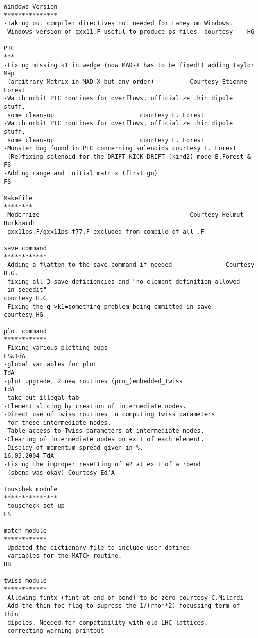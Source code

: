 \begin{verbatim}
Windows Version
***************
-Taking out compiler directives not needed for Lahey om Windows.
-Windows version of gxx11.F useful to produce ps files  courtesy    HG

PTC
***
-Fixing missing k1 in wedge (now MAD-X has to be fixed!) adding Taylor Map
 (arbitrary Matrix in MAD-X but any order)          Courtesy Etienne Forest
-Watch orbit PTC routines for overflows, officialize thin dipole stuff,
 some clean-up                        courtesy E. Forest
-Watch orbit PTC routines for overflows, officialize thin dipole stuff,
 some clean-up                        courtesy E. Forest
-Monster bug found in PTC concerning solenoids courtesy E. Forest
-(Re)fixing solenoid for the DRIFT-KICK-DRIFT (kind2) mode E.Forest & FS
-Adding range and initial matrix (first go)                           FS

Makefile
********
-Modernize                                          Courtesy Helmut Burkhardt
-gxx11ps.F/gxx11ps_f77.F excluded from compile of all .F

save command
************
-Adding a flatten to the save command if needed               Courtesy H.G.
-fixing all 3 save deficiencies and "no element definition allowed
 in seqedit"                                                   courtesy H.G
-Fixing the q->k1=something problem being ommitted in save     courtesy HG

plot command
************
-Fixing various plotting bugs                                         FS&TdA
-global variables for plot                                           TdA
-plot upgrade, 2 new routines (pro_)embedded_twiss                    TdA
-take out illegal tab
-Element slicing by creation of intermediate nodes.
-Direct use of twiss routines in computing Twiss parameters 
 for these intermediate nodes.
-Table access to Twiss parameters at intermediate nodes.
-Clearing of intermediate nodes on exit of each element.
-Display of momentum spread given in %.                       16.03.2004 TdA
-Fixing the improper resetting of e2 at exit of a rbend 
 (sbend was okay) Courtesy Ed'A

touschek module
***************
-touscheck set-up                                                     FS

match module
************
-Updated the dictionary file to include user defined
 variables for the MATCH routine.                                      OB

twiss module
************
-Allowing fintx (fint at end of bend) to be zero courtesy C.Milardi
-Add the thin_foc flag to supress the 1/(rho**2) focussing term of thin
 dipoles. Needed for compatibility with old LHC lattices.
-correcting warning printout


\end{verbatim}
